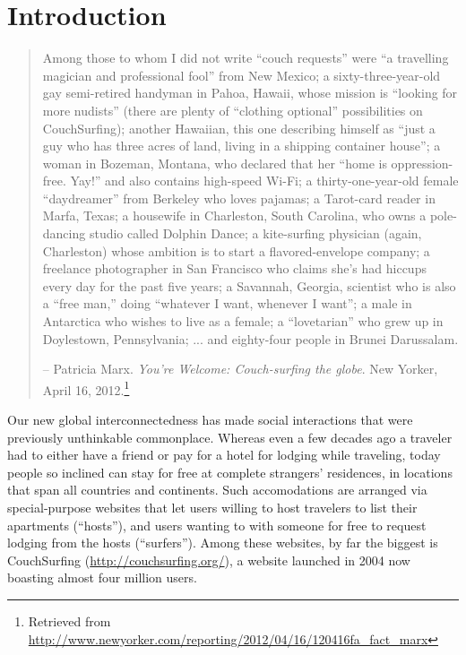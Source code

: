 \section{Introduction}

\begin{quotation}
Among those to whom I did not write “couch requests” were “a travelling magician and professional fool” from New Mexico; a sixty-three-year-old gay semi-retired handyman in Pahoa, Hawaii, whose mission is “looking for more nudists” (there are plenty of “clothing optional” possibilities on CouchSurfing); another Hawaiian, this one describing himself as “just a guy who has three acres of land, living in a shipping container house”; a woman in Bozeman, Montana, who declared that her “home is oppression-free. Yay!” and also contains high-speed Wi-Fi; a thirty-one-year-old female “daydreamer” from Berkeley who loves pajamas; a Tarot-card reader in Marfa, Texas; a housewife in Charleston, South Carolina, who owns a pole-dancing studio called Dolphin Dance; a kite-surfing physician (again, Charleston) whose ambition is to start a flavored-envelope company; a freelance photographer in San Francisco who claims she’s had hiccups every day for the past five years; a Savannah, Georgia, scientist who is also a “free man,” doing “whatever I want, whenever I want”; a male in Antarctica who wishes to live as a female; a “lovetarian” who grew up in Doylestown, Pennsylvania; ... and eighty-four people in Brunei Darussalam.

-- Patricia Marx. \emph{You're Welcome: Couch-surfing the globe}. New Yorker, April 16, 2012.\footnote{Retrieved from \url{http://www.newyorker.com/reporting/2012/04/16/120416fa_fact_marx}}
\end{quotation}

Our new global interconnectedness has made social interactions that were previously unthinkable commonplace.
Whereas even a few decades ago a traveler had to either have a friend or pay for a hotel for lodging while traveling, today people so inclined can stay for free at complete strangers' residences, in locations that span all countries and continents.
Such accomodations are arranged via special-purpose websites that let users willing to host travelers to list their apartments (``hosts''), and users wanting to with someone for free to request lodging from the hosts (``surfers'').
Among these websites, by far the biggest is CouchSurfing (\url{http://couchsurfing.org/}), a website launched in 2004 now boasting almost four million users.

